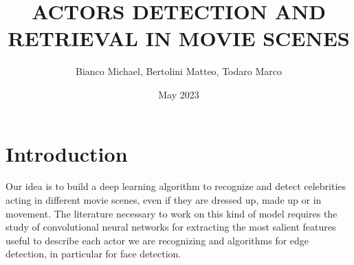 \documentclass{article}
\title{ACTORS DETECTION AND RETRIEVAL IN MOVIE SCENES}
\author{Bianco Michael, Bertolini Matteo, Todaro Marco}
\date{May 2023}
\begin{document}
\maketitle
\section{Introduction}

Our idea is to build a deep learning algorithm to recognize and detect celebrities acting in different 
movie scenes, 
even if they are dressed up, made up or in movement.
The literature necessary to work on this kind of model requires the study of convolutional neural networks
for extracting the most salient features useful to describe each actor we are recognizing and algorithms for edge
detection, in particular for face detection.
\end{document}
